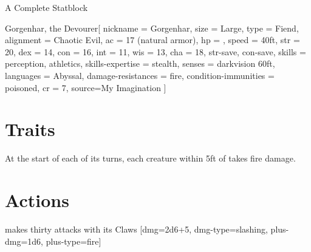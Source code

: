 \begin{ExampleBlock}{A Complete Statblock}
\begin{RpgStat}{Gorgenhar, the Devourer}[
    nickname = Gorgenhar,
    size = Large, type = Fiend, alignment = Chaotic Evil,
    ac = 17 (natural armor), hp = , speed = 40ft,
    str = 20, dex = 14, con = 16, int = 11, wis = 13, cha = 18,
    str-save, con-save,
    skills = {perception, athletics}, skills-expertise = {stealth},
    senses = darkvision 60ft, languages = Abyssal,
    damage-resistances = fire, condition-immunities = poisoned,
    cr = 7,
    source={My Imagination}
]
    \section{Traits}
         At the start of each of its turns, each creature within 5ft of \name{} takes  fire damage.
    \section{Actions}

        \begin{multiattack}{\name{} makes thirty attacks with its Claws}
        [dmg=2d6+5, dmg-type=slashing, plus-dmg=1d6, plus-type=fire]
        \end{multiattack}
\end{RpgStat}


\end{ExampleBlock}

